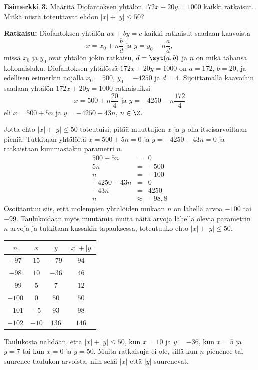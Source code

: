 {\bf Esimerkki 3.}
Määritä Diofantoksen yhtälön $172x + 20y = 1000$ kaikki
ratkaisut. Mitkä niistä toteuttavat ehdon $|x|+|y|\le
50$?

{\bf Ratkaisu:}
Diofantoksen yhtälön $ax+by=c$ kaikki ratkaisut saadaan
kaavoista
\[
x=x_0+n\frac{b}{d}\textrm{ ja }y=y_0-n\frac{a}{d},
\]
missä $x_0$ ja $y_0$ ovat yhtälön jokin ratkaisu,
$d=\syt(a,b)$ ja $n$ on mikä tahansa
kokonaisluku. Diofantoksen yhtälössä $172x+20y=1000$ on
$a=172$, $b=20$, ja edellisen
esimerkin nojalla $x_0=500$, $y_0=-4250$ ja $d=4$.
Sijoittamalla kaavoihin saadaan
yhtälön $172x+20y=1000$ ratkaisuiksi
\[
x=500+n\frac{20}{4}\textrm{ ja }y=-4250-n\frac{172}{4}
\]
eli $x=500+5n$ ja $y=-4250-43n$, $n\in\Z$.

Jotta ehto $|x| +|y|\le 50$ toteutuisi, pitää muuttujien
$x$ ja $y$ olla itseisarvoiltaan pieniä. Tutkitaan
yhtälöitä $x = 500 + 5n = 0$ ja $y = -4250 - 43n = 0$ ja
ratkaistaan kummastakin parametri $n$.
\begin{eqnarray*}
500 + 5n &=& 0\\
5n &=& -500\\
n &=& -100\\
-4250 - 43n &=& 0\\
-43n &=& 4250\\
n &\approx&-98,8
\end{eqnarray*}
Osoittautuu siis, että molempien yhtälöiden mukaan $n$
on lähellä arvoa $-100$ tai $-99$. Taulukoidaan myös
muutamia muita näitä arvoja lähellä olevia parametrin $n$
arvoja ja tutkitaan kussakin tapauksessa, toteutuuko ehto
$|x| + |y| \le 50$.

\begin{center}
\begin{tabular}{|c|c|c|c|}
\hline
$n$ & $x$ & $y$ & $|x|+|y|$ \\

\hline
$-97$&$15$&$-79$&$94$\\
\hline
$-98$&$10$&$-36$&$46$\\
\hline
$-99$&$5$&$7$&$12$\\
\hline
$-100$&$0$&$50$&$50$\\
\hline
$-101$&$-5$&$93$&$98$\\
\hline
$-102$&$-10$&$136$&$146$\\
\hline
\end{tabular}
\end{center}

Taulukosta nähdään, että $|x|+|y| \le 50$, kun $x = 10$
ja $y = -36$, kun $x = 5$ ja $y = 7$ tai kun $x = 0$ ja
$y = 50$. Muita ratkaisuja ei ole, sillä kun $n$ pienenee
tai suurenee taulukon arvoista, niin sekä $|x|$ että $|
y|$ suurenevat.


